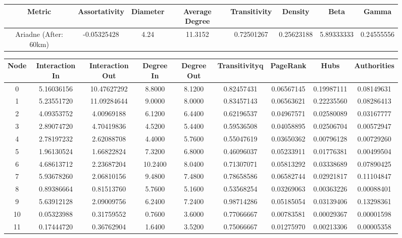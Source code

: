 \documentclass[12pt,a4paper]{thesis}
\begin{document}
\begin{figure}[H]
\centering
\tiny
\begin{tabular}{|c|c|c|c|c|c|c|c|}
\hline Metric & Assortativity & Diameter & Average Degree & Transitivity & Density & Beta & Gamma \\ 
\hline Ariadne (After: 60km) & -0.05325428	& 4.24 & 11.3152	& 0.72501267 & 0.25623188 & 5.89333333 & 0.24555556 \\ 
\hline 
\end{tabular} 
\end{figure}

\begin{figure}[H]
\centering
\tiny
\begin{tabular}{|c|c|c|c|c|c|c|c|c|}
\hline	Node	&	Interaction In	&	Interaction Out	&	Degree In	&	Degree Out	&	Transitivityq	&	PageRank	&	Hubs	&	Authorities	\\
\hline	0	&	5.16036156	&	10.47627292	&	8.8000	&	8.1200	&	0.82457431	&	0.06567145	&	0.19987111	&	0.08149631	\\
\hline	1	&	5.23551720	&	11.09284644	&	9.0000	&	8.0000	&	0.83457143	&	0.06563621	&	0.22235560	&	0.08286413	\\
\hline	2	&	4.09353752	&	4.00969188	&	6.1200	&	6.4400	&	0.62196537	&	0.04967571	&	0.02580089	&	0.03167777	\\
\hline	3	&	2.89074720	&	4.70419836	&	4.5200	&	5.4400	&	0.59536508	&	0.04058895	&	0.02506704	&	0.00572947	\\
\hline	4	&	2.78197232	&	2.62088708	&	4.4000	&	5.7600	&	0.55047619	&	0.03650362	&	0.00796128	&	0.00729260	\\
\hline	5	&	1.96130524	&	1.66822824	&	7.3200	&	6.8000	&	0.46096037	&	0.05233911	&	0.01776381	&	0.00499504	\\
\hline	6	&	4.68613712	&	2.23687204	&	10.2400	&	8.0400	&	0.71307071	&	0.05813292	&	0.03338689	&	0.07890425	\\
\hline	7	&	5.93678260	&	2.06810156	&	9.4800	&	7.4800	&	0.78658586	&	0.06582744	&	0.02921817	&	0.11104847	\\
\hline	8	&	0.89386664	&	0.81513760	&	5.7600	&	5.1600	&	0.53568254	&	0.03269063	&	0.00363226	&	0.00088401	\\
\hline	9	&	5.63912128	&	2.09009756	&	6.2400	&	7.2400	&	0.98714286	&	0.05185054	&	0.03139406	&	0.13298361	\\
\hline	10	&	0.05323988	&	0.31759552	&	0.7600	&	3.6000	&	0.77066667	&	0.00783581	&	0.00029367	&	0.00001598	\\
\hline	11	&	0.17444720	&	0.36762904	&	1.6400	&	3.5200	&	0.75066667	&	0.01275970	&	0.00213306	&	0.00005358	\\

\end{tabular}
\end{figure}
\end{document}
